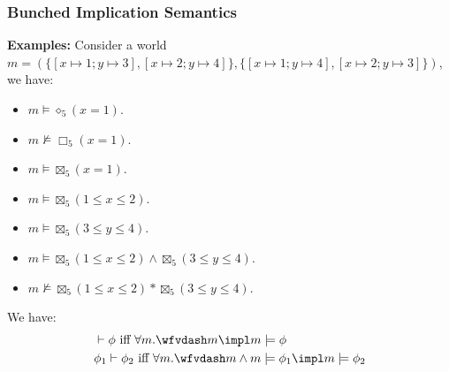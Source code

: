 \begin{frame}[fragile]
    \frametitle{Bunched Implication Semantics}

\textbf{Examples:} Consider a world $m = (\{[x\mapsto 1;y\mapsto 3], [x\mapsto 2;y\mapsto 4]\}, \{[x\mapsto 1;y\mapsto 4], [x\mapsto 2;y\mapsto 3]\})$, we have:
\begin{itemize}
    \item $m \models \diamond_5 (x = 1)$.
    \item $m \not\models \Box_5 (x = 1)$.
    \item $m \models \boxtimes_5 (x = 1)$.
    \item $m \models \boxtimes_5 (1 \leq x \leq 2)$.
    \item $m \models \boxtimes_5 (3 \leq y \leq 4)$.
    \item $m \models \boxtimes_5 (1 \leq x \leq 2) \land \boxtimes_5 (3 \leq y \leq 4)$.
    \item $m \not\models \boxtimes_5 (1 \leq x \leq 2) * \boxtimes_5 (3 \leq y \leq 4)$.
\end{itemize}

\begin{definition}
We have:
    \begin{align*}
    &\vdash \phi \text{ iff } \forall m. \wfvdash m \impl m \models \phi
    \\&\phi_1 \vdash \phi_2 \text{ iff } \forall m. \wfvdash m \land m \models \phi_1 \impl m \models \phi_2
    \end{align*}\noindent
\end{definition}

\end{frame}
